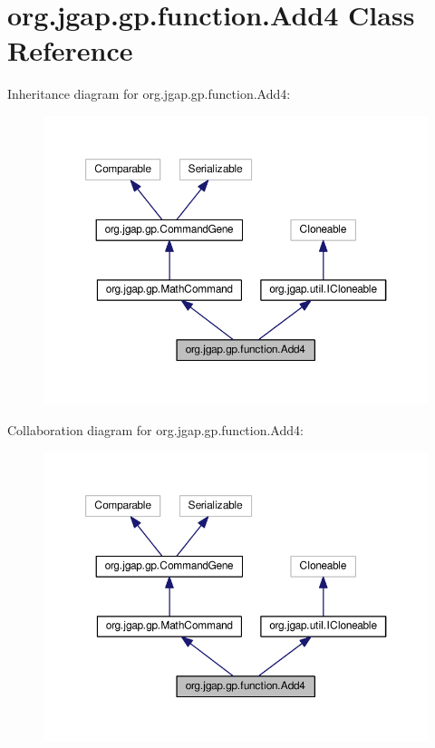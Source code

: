 \hypertarget{classorg_1_1jgap_1_1gp_1_1function_1_1_add4}{\section{org.\-jgap.\-gp.\-function.\-Add4 Class Reference}
\label{classorg_1_1jgap_1_1gp_1_1function_1_1_add4}
}


Inheritance diagram for org.\-jgap.\-gp.\-function.\-Add4\-:
\nopagebreak
\begin{figure}[H]
\begin{center}
\leavevmode
\includegraphics[width=350pt]{classorg_1_1jgap_1_1gp_1_1function_1_1_add4__inherit__graph}
\end{center}
\end{figure}


Collaboration diagram for org.\-jgap.\-gp.\-function.\-Add4\-:
\nopagebreak
\begin{figure}[H]
\begin{center}
\leavevmode
\includegraphics[width=350pt]{classorg_1_1jgap_1_1gp_1_1function_1_1_add4__coll__graph}
\end{center}
\end{figure}
